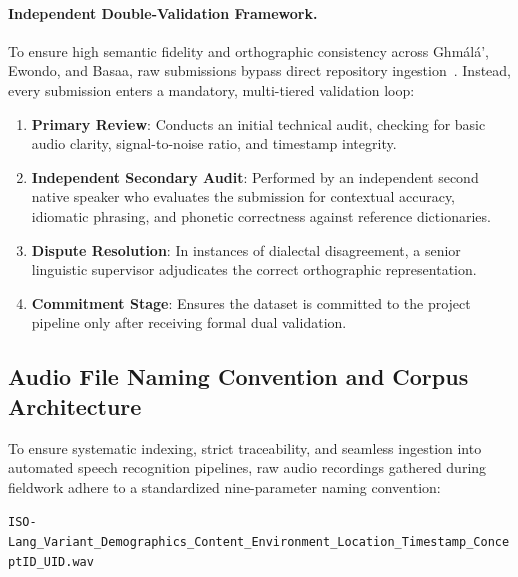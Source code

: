 \documentclass[a4paper,11pt]{article}
\begin{document}
\paragraph{Independent Double-Validation Framework.}
To ensure high semantic fidelity and orthographic consistency across Gh\textopeno m\'al\'a', Ewondo, and Basaa, raw submissions bypass direct repository ingestion~\cite{bird2014coscab}. Instead, every submission enters a mandatory, multi-tiered validation loop:
\begin{enumerate}
    \item \textbf{Primary Review}: Conducts an initial technical audit, checking for basic audio clarity, signal-to-noise ratio, and timestamp integrity.
    \item \textbf{Independent Secondary Audit}: Performed by an independent second native speaker who evaluates the submission for contextual accuracy, idiomatic phrasing, and phonetic correctness against reference dictionaries.
    \item \textbf{Dispute Resolution}: In instances of dialectal disagreement, a senior linguistic supervisor adjudicates the correct orthographic representation.
    \item \textbf{Commitment Stage}: Ensures the dataset is committed to the project pipeline only after receiving formal dual validation.
\end{enumerate}

\subsection{Audio File Naming Convention and Corpus Architecture}
\label{sec:naming}

To ensure systematic indexing, strict traceability, and seamless ingestion into automated speech recognition pipelines, raw audio recordings gathered during fieldwork adhere to a standardized nine-parameter naming convention:

\vspace{0.5em}
\begin{center}
\texttt{ISO-Lang\_Variant\_Demographics\_Content\_Environment\_Location\_Timestamp\_ConceptID\_UID.wav}
\end{center}
\vspace{0.5em}
\end{document}
